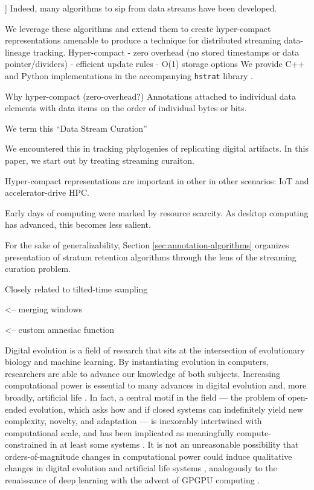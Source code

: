 ]
Indeed, many algorithms to sip from data streams have been developed.


We leverage these algorithms and extend them to create hyper-compact representations amenable to produce a technique for distributed streaming data-lineage tracking.
Hyper-compact
- zero overhead (no stored timestamps or data pointer/dividers)
- efficient update rules
- O(1) storage options
We provide C++ and Python implementations in the accompanying \texttt{hstrat} library \citep{moreno2022hstrat}.


Why hyper-compact (zero-overhead?) Annotations attached to individual data elements with data items on the order of individual bytes or bits.


We term this ``Data Stream Curation''

We encountered this in tracking phylogenies of replicating digital artifacts.
In this paper, we start out by treating streaming curaiton.

Hyper-compact representations are important in other in other scenarios: IoT and accelerator-drive HPC.

Early days of computing were marked by resource scarcity.
As desktop computing has advanced, this becomes less salient.

For the sake of generalizability, Section \ref{sec:annotation-algorithms} organizes presentation of stratum retention algorithms through the lens of the streaming curation problem.


Closely related to tilted-time sampling \citep{giannella2003mining,han2005stream}

\citep{zhao2005generalized} <-- merging windows

\citep{palpanas2004online} <-- custom amnesiac function



Digital evolution is a field of research that sits at the intersection of evolutionary biology and machine learning.
By instantiating evolution in computers, researchers are able to advance our knowledge of both subjects.
Increasing computational power is essential to many advances in digital evolution and, more broadly, artificial life \citep{ackley2014indefinitely}.
In fact, a central motif in the field --- the problem of open-ended evolution, which asks how and if closed systems can indefinitely yield new complexity, novelty, and adaptation --- is inexorably intertwined with computational scale, and has been implicated as meaningfully compute-constrained in at least some systems \citep{taylor2016open,channon2019maximum}.
It is not an unreasonable possibility that orders-of-magnitude changes in computational power could induce qualitative changes in digital evolution and artificial life systems \citep{moreno2022engineering}, analogously to the renaissance of deep learning with the advent of GPGPU computing \citep{krizhevsky2012imagenet}.

